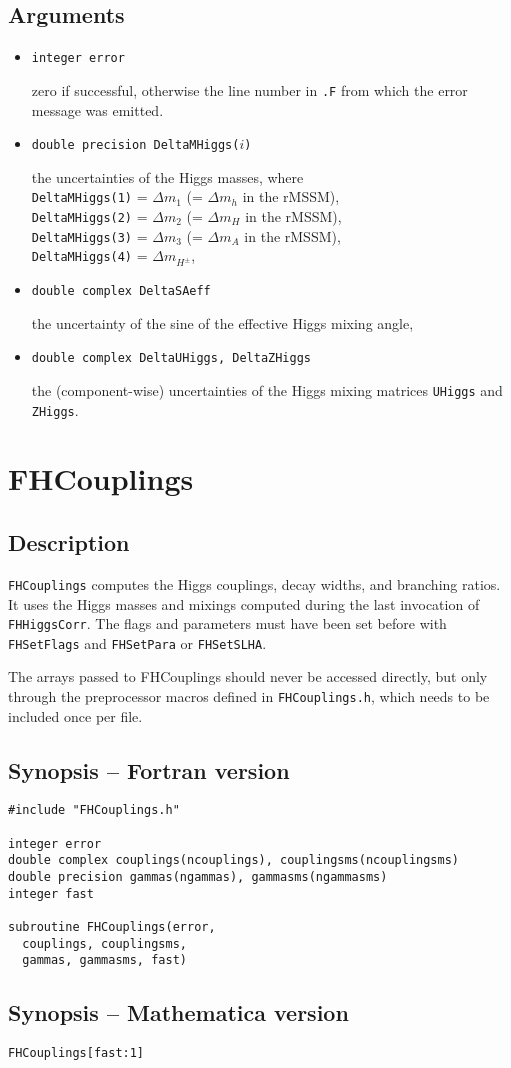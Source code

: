 \documentclass[12pt,a4paper]{report}
\newcommand{\CODE}[1]{\texttt{#1}}
\newcommand{\VAROUT}[1]{%
  \item[\fbox{\scriptsize\textsc{out}}]
  \CODE{#1}\par}
\newcommand{\ROUTINE}[1]{\pagebreak
  \section*{#1}%
  \addcontentsline{toc}{section}{#1}}
\newcommand{\DESCRIPTION}{\subsection*{Description}}
\newcommand{\FSYNOPSIS}{\subsection*{Synopsis -- Fortran version}}
\newcommand{\MSYNOPSIS}{\subsection*{Synopsis -- Mathematica version}}
\newcommand{\ARGUMENTS}{\subsection*{Arguments}\begin{itemize}}
\newcommand{\ENDARGUMENTS}{\end{itemize}}
\begin{document}
\ARGUMENTS

\VAROUT{integer error}
zero if successful, otherwise the line number in \CODE{.F}
from which the error message was emitted.

\VAROUT{double precision DeltaMHiggs($i$)}
the uncertainties of the Higgs masses, where \\
  \CODE{DeltaMHiggs(1)} = $\Delta m_1$ (= $\Delta m_h$ in the rMSSM), \\
  \CODE{DeltaMHiggs(2)} = $\Delta m_2$ (= $\Delta m_H$ in the rMSSM), \\
  \CODE{DeltaMHiggs(3)} = $\Delta m_3$ (= $\Delta m_A$ in the rMSSM), \\
  \CODE{DeltaMHiggs(4)} = $\Delta m_{H^\pm}$,

\VAROUT{double complex DeltaSAeff}
the uncertainty of the sine of the effective Higgs mixing angle,

\VAROUT{double complex DeltaUHiggs, DeltaZHiggs}
the (component-wise) uncertainties of the Higgs mixing matrices
\CODE{UHiggs} and \CODE{ZHiggs}.

\ENDARGUMENTS


\ROUTINE{FHCouplings}

\DESCRIPTION

\CODE{FHCouplings} computes the Higgs couplings, decay widths, and
branching ratios.  It uses the Higgs masses and mixings computed during
the last invocation of \CODE{FHHiggsCorr}.  The flags and parameters
must have been set before with \CODE{FHSetFlags} and \CODE{FHSetPara} or 
\CODE{FHSetSLHA}.

The arrays passed to FHCouplings should never be accessed directly, but
only through the preprocessor macros defined in \CODE{FHCouplings.h},
which needs to be included once per file.

\FSYNOPSIS

\begin{verbatim}
#include "FHCouplings.h"

integer error
double complex couplings(ncouplings), couplingsms(ncouplingsms)
double precision gammas(ngammas), gammasms(ngammasms)
integer fast

subroutine FHCouplings(error,
  couplings, couplingsms,
  gammas, gammasms, fast)
\end{verbatim}

\MSYNOPSIS

\begin{verbatim}
FHCouplings[fast:1]
\end{verbatim}
\end{document}
